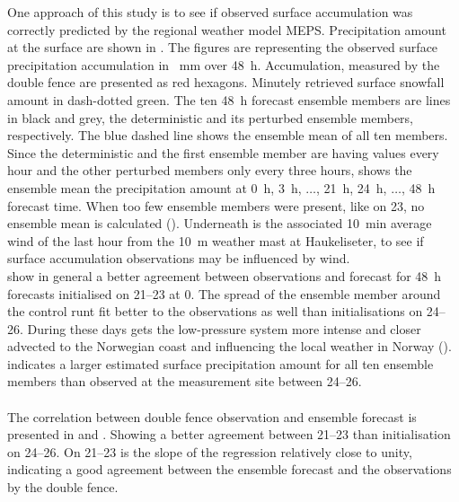 One approach of this study is to see if observed surface accumulation was correctly predicted by the regional weather model MEPS. Precipitation amount at the surface are shown in . The figures are representing the observed surface precipitation accumulation in \SI{}{\mm} over \SI{48}{\hour}. Accumulation, measured by the double fence are presented as red hexagons. Minutely retrieved surface snowfall amount in dash-dotted green. The ten \SI{48}{\hour} forecast ensemble members are lines in black and grey, the deterministic and its perturbed ensemble members, respectively. The blue dashed line shows the ensemble mean of all ten members. Since the deterministic and the first ensemble member are having values every hour and the other perturbed members only every three hours, shows the ensemble mean the precipitation amount at \SI{0}{\hour}, \SI{3}{\hour}, $\ldots$, \SI{21}{\hour}, \SI{24}{\hour}, $\ldots$, \SI{48}{\hour} forecast time. When too few ensemble members were present, like on \SI{23}{\dec}, no ensemble mean is calculated (). 
Underneath is the associated \SI{10}{\minute} average wind of the last hour from the \SI{10}{\metre} weather mast at Haukeliseter, to see if surface accumulation observations may be influenced by wind. 
\\
 show in general a better agreement between observations and forecast for \SI{48}{\hour} forecasts initialised on \SIrange{21}{23}{\dec} at \SI{0}{\UTC}. The spread of the ensemble member around the control runt fit better to the observations as well than initialisations on \SIrange{24}{26}{\dec}. 
During these days gets the low-pressure system more intense and closer advected to the Norwegian coast and influencing the local weather in Norway ().  indicates a larger estimated surface precipitation amount for all ten ensemble members than observed at the measurement site between \SIrange{24}{26}{\dec}. 
\\ 
\\
The correlation between double fence observation and ensemble forecast is presented in  and . Showing a better agreement between \SIrange{21}{23}{\dec} than initialisation on \SIrange{24}{26}{\dec}. On \SIrange{21}{23}{\dec} is the slope of the regression relatively close to unity, indicating a good agreement between the ensemble forecast and the observations by the double fence.
